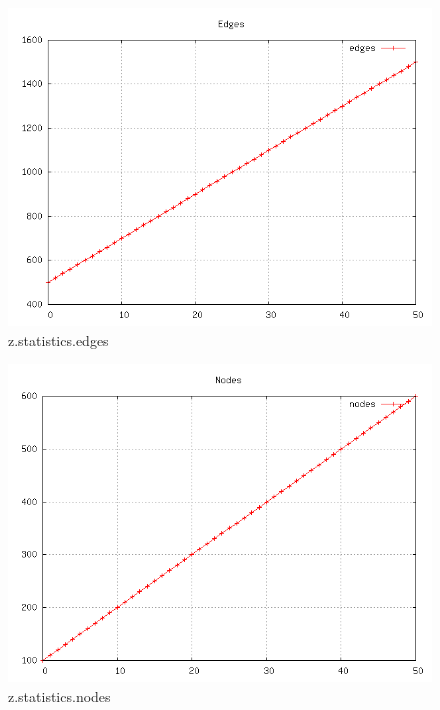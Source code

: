 \begin{figure} [h]
	\centering
	\includegraphics [scale=0.8] {plots/z.statistics.edges}
	\caption{z.statistics.edges}
	\label{plot:RANDOM_100_500 - BARABASI_ALBERT_GROWTH_10_2.z.statistics.edges}
\end{figure}

\begin{figure} [h]
	\centering
	\includegraphics [scale=0.8] {plots/z.statistics.nodes}
	\caption{z.statistics.nodes}
	\label{plot:RANDOM_100_500 - BARABASI_ALBERT_GROWTH_10_2.z.statistics.nodes}
\end{figure}


